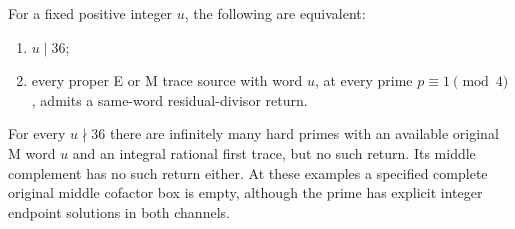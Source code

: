 \begin{theorem}\label{thm:optimal}
For a fixed positive integer $u$, the following are equivalent:
\begin{enumerate}
\item $u\mid36$;
\item every proper E or M trace source with word $u$, at every prime
$p\equiv1\pmod4$, admits a same-word residual-divisor return.
\end{enumerate}
For every $u\nmid36$ there are infinitely many hard primes with an available
original M word $u$ and an integral rational first trace, but no such return.
Its middle complement has no such return either. At these examples a specified
complete original middle cofactor box is empty, although the prime has explicit
integer endpoint solutions in both channels.
\end{theorem}
